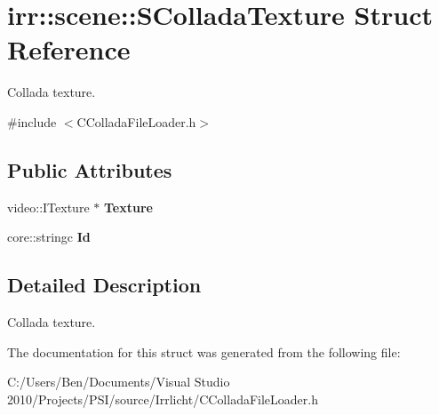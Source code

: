 \hypertarget{structirr_1_1scene_1_1_s_collada_texture}{\section{irr\-:\-:scene\-:\-:S\-Collada\-Texture Struct Reference}
\label{structirr_1_1scene_1_1_s_collada_texture}
}


Collada texture.  




{\ttfamily \#include $<$C\-Collada\-File\-Loader.\-h$>$}

\subsection*{Public Attributes}
\begin{DoxyCompactItemize}
\item 
\hypertarget{structirr_1_1scene_1_1_s_collada_texture_a5f1ec559091a8e5ab3c8263c52899589}{video\-::\-I\-Texture $\ast$ {\bfseries Texture}}\label{structirr_1_1scene_1_1_s_collada_texture_a5f1ec559091a8e5ab3c8263c52899589}

\item 
\hypertarget{structirr_1_1scene_1_1_s_collada_texture_ad524c4cfae2de270016567267ca1af88}{core\-::stringc {\bfseries Id}}\label{structirr_1_1scene_1_1_s_collada_texture_ad524c4cfae2de270016567267ca1af88}

\end{DoxyCompactItemize}


\subsection{Detailed Description}
Collada texture. 

The documentation for this struct was generated from the following file\-:\begin{DoxyCompactItemize}
\item 
C\-:/\-Users/\-Ben/\-Documents/\-Visual Studio 2010/\-Projects/\-P\-S\-I/source/\-Irrlicht/C\-Collada\-File\-Loader.\-h\end{DoxyCompactItemize}
